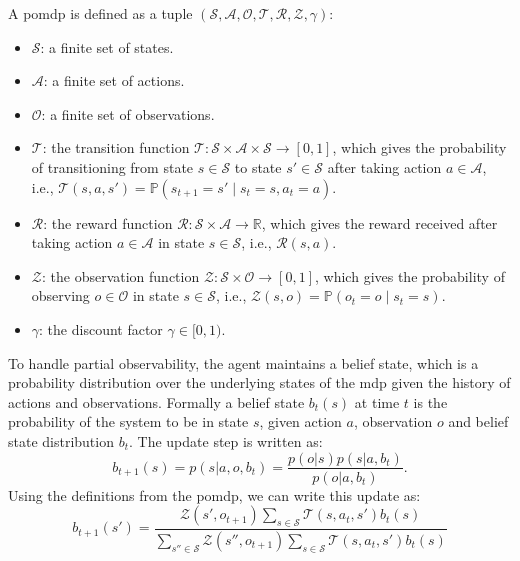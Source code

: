 A \ac{pomdp} is defined as a tuple $(\mathcal{S}, \mathcal{A}, \mathcal{O}, \mathcal{T}, \mathcal{R}, \mathcal{Z}, \gamma)$:

\begin{itemize}
\item $\mathcal{S}$: a finite set of states.
\item $\mathcal{A}$: a finite set of actions.
\item $\mathcal{O}$: a finite set of observations.
\item $\mathcal{T}$: the transition function $\mathcal{T}: \mathcal{S} \times \mathcal{A} \times \mathcal{S} \rightarrow [0, 1]$, which gives the probability of transitioning from state $s \in \mathcal{S}$ to state $s' \in \mathcal{S}$ after taking action $a \in \mathcal{A}$, i.e., $\mathcal{T}(s, a, s') = \mathbb{P}(s_{t+1} = s' \mid s_t = s, a_t = a)$.
\item $\mathcal{R}$: the reward function $\mathcal{R}: \mathcal{S} \times \mathcal{A} \rightarrow \mathbb{R}$, which gives the reward received after taking action $a \in \mathcal{A}$ in state $s \in \mathcal{S}$, i.e., $\mathcal{R}(s, a)$.
\item $\mathcal{Z}$: the observation function $\mathcal{Z}: \mathcal{S} \times \mathcal{O} \rightarrow [0, 1]$, which gives the probability of observing $o \in \mathcal{O}$ in state $s \in \mathcal{S}$, i.e., $\mathcal{Z}(s, o) = \mathbb{P}(o_{t} = o \mid s_t = s)$.
\item $\gamma$: the discount factor $\gamma \in [0, 1)$.
\end{itemize}

To handle partial observability, the agent maintains a belief state, which is a probability distribution over the underlying states of the \ac{mdp} given the history of 
actions and observations. Formally a belief state $b_t(s)$ at time $t$ is the probability of the system to be in state $s$, 
given action $a$, observation $o$ and belief state distribution $b_{t}$. The update step is written as:
\begin{equation*}
    b_{t+1}(s) = p(s|a,o,b_{t}) = \frac{p(o|s) p(s|a,b_{t})}{p(o|a,b_{t})}.
\end{equation*}
Using the definitions from the \ac{pomdp}, we can write this update as:
\begin{equation}
    \label{pomdp_bayes}
b_{t+1}(s') = \frac{\mathcal{Z}(s', o_{t+1}) \sum_{s \in \mathcal{S}} \mathcal{T}(s, a_t, s') b_t(s)}{\sum_{s'' \in \mathcal{S}} \mathcal{Z}(s'', o_{t+1}) \sum_{s \in \mathcal{S}} \mathcal{T}(s, a_t, s') b_t(s)}
\end{equation}

